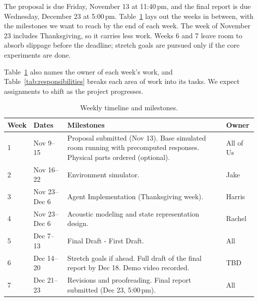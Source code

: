 \documentclass{article}
\begin{document}
The proposal is due Friday, November 13 at 11:40\,pm, and the final report is
due Wednesday, December 23 at 5:00\,pm. Table~\ref{tab:timeline} lays out the
weeks in between, with the milestones we want to reach by the end of each
week. The week of November 23 includes Thanksgiving, so it carries less work.
Weeks 6 and 7 leave room to absorb slippage before the deadline; stretch goals
are pursued only if the core experiments are done.

Table~\ref{tab:timeline} also names the owner of each week's work, and
Table~\ref{tab:responsibilities} breaks each area of work into its tasks. We
expect assignments to shift as the project progresses.

\begin{table}[!htbp]
\centering
\small
\begin{tabular}{|l|>{\raggedright\arraybackslash}p{0.85in}|>{\raggedright\arraybackslash}p{2.3in}|p{0.45in}|}
\hline
\textbf{Week} & \textbf{Dates} & \textbf{Milestones} & \textbf{Owner} \\
\hline
1 & Nov 9--15 &
Proposal submitted (Nov 13). Base simulated room running with precomputed
responses. Physical parts ordered (optional). & All of Us \\
\hline
2 & Nov 16--22 &
Environment simulator. & Jake \\
\hline
3 & Nov 23--Dec 6 &
Agent Implementation
(Thanksgiving week). & Harris \\
\hline
4 & Nov 23--Dec 6 &
Acoustic modeling and state representation design. & Rachel \\
\hline
5 & Dec 7--13 &
Final Draft - First Draft. & All \\
\hline
6 & Dec 14--20 &
Stretch goals if ahead. Full draft of the final report by Dec 18. Demo video
recorded. & TBD \\
\hline
7 & Dec 21--23 &
Revisions and proofreading. Final report submitted (Dec 23, 5:00\,pm). & All \\
\hline
\end{tabular}
\caption{Weekly timeline and milestones.}
\label{tab:timeline}
\end{table}
\end{document}
